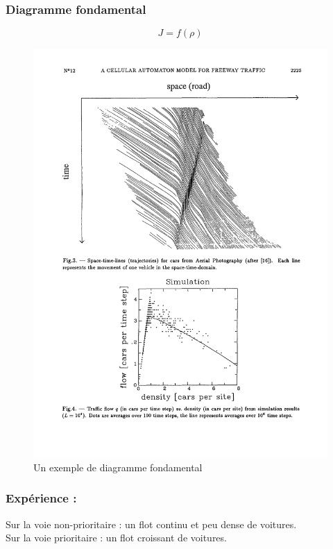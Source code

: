 \documentclass[slidetop,11pt]{beamer}
\begin{document}
\begin{frame}
	\frametitle{Diagramme fondamental}
	$$J = f(\rho)$$
	\begin{figure}
		\begin{center}	
			\includegraphics[scale = 0.7]{./images/dfondcomp}
		\end{center}
	\caption{Un exemple de diagramme fondamental}
	\end{figure}
\end{frame}
	
\begin{frame}
	\frametitle{Expérience :}
	Sur la voie non-prioritaire : un flot continu et peu dense de voitures.\\
	Sur la voie prioritaire : un flot croissant de voitures.
\end{frame}
	
\end{document}
